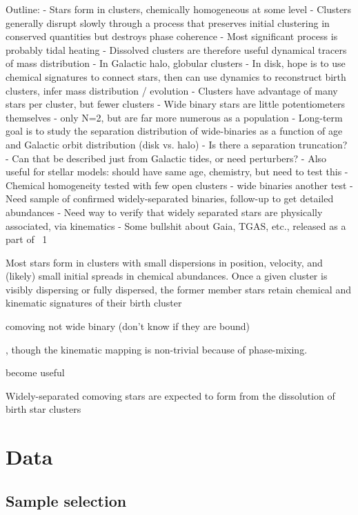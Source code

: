 \documentclass[modern, letterpaper]{aastex61}
\newcommand{\gaia}{\project{Gaia}}
\newcommand{\DR}[1]{\acronym{DR}1}
\begin{document}
Outline:
- Stars form in clusters, chemically homogeneous at some level
- Clusters generally disrupt slowly through a process that preserves initial
  clustering in conserved quantities but destroys phase coherence
- Most significant process is probably tidal heating
- Dissolved clusters are therefore useful dynamical tracers of mass distribution
- In Galactic halo, globular clusters
- In disk, hope is to use chemical signatures to connect stars, then can use
  dynamics to reconstruct birth clusters, infer mass distribution / evolution
- Clusters have advantage of many stars per cluster, but fewer clusters
- Wide binary stars are little potentiometers themselves - only N=2, but are far
  more numerous as a population
- Long-term goal is to study the separation distribution of wide-binaries as a
  function of age and Galactic orbit distribution (disk vs. halo)
    - Is there a separation truncation?
    - Can that be described just from Galactic tides, or need perturbers?
- Also useful for stellar models: should have same age, chemistry, but need to
  test this
    - Chemical homogeneity tested with few open clusters - wide binaries another
      test
    - Need sample of confirmed widely-separated binaries, follow-up to get
      detailed abundances
    - Need way to verify that widely separated stars are physically associated,
      via kinematics
- Some bullshit about Gaia, TGAS, etc., released as a part of \gaia\ \DR{1}\

\cite{Gaia-Collaboration:2016,Gaia-Collaboration:2016a}

Most stars form in clusters with small dispersions in position, velocity, and
(likely) small initial spreads in chemical abundances.
Once a given cluster is visibly dispersing or fully dispersed, the former member
stars retain chemical and kinematic signatures of their birth cluster

comoving not wide binary (don't know if they are bound)

, though
the kinematic mapping is non-trivial because of phase-mixing.

become
useful

Widely-separated comoving stars are expected to form from the dissolution of
birth star clusters


\section{Data}\label{sec:data}

\subsection{Sample selection}\label{sec:sample}
\end{document}
